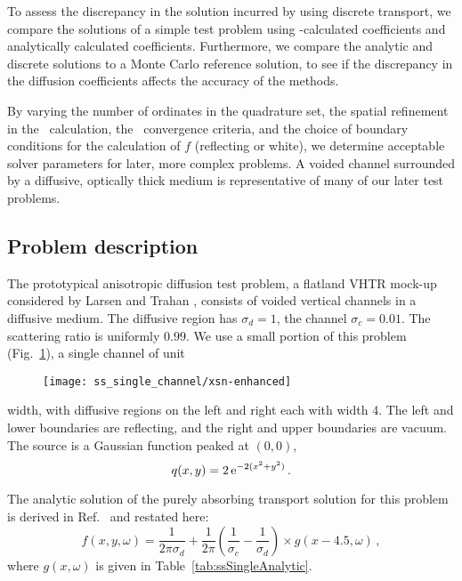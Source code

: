To assess the discrepancy in the solution incurred by using discrete transport,
we compare the solutions of a simple test problem using \SN-calculated
coefficients and analytically calculated coefficients. Furthermore, we compare
the analytic and discrete solutions to a Monte Carlo reference solution, to see
if the discrepancy in the diffusion coefficients affects the accuracy of
the methods.

By varying the number of ordinates in the quadrature set, the spatial
refinement in the \SN\ calculation, the \SN\ convergence criteria, and the
choice of boundary conditions for the calculation of $f$ (reflecting or white),
we determine acceptable solver parameters for later, more complex
problems.  A
voided channel surrounded by a diffusive, optically thick medium is
representative of many of our later test problems.

\subsection{Problem description}

The prototypical anisotropic diffusion test problem, a flatland VHTR mock-up
considered by Larsen and Trahan \cite{Lar2009c}, consists of voided vertical channels in a
diffusive medium. The diffusive region has $\sigma_d=1$, the channel
$\sigma_c=0.01$. The scattering ratio is uniformly $0.99$.  We use a small
portion of this problem (Fig.~\ref{fig:ssSingleXsn}), a single channel of unit
%
\begin{figure}[htb]
  \centering
  \texttt{[image: ss\_single\_channel/xsn-enhanced]}
  \label{fig:ssSingleXsn}
\end{figure}
%
width, with diffusive regions on the left and right each with width 4. The left
and lower boundaries are reflecting, and the right and upper boundaries are
vacuum. The source is a Gaussian function peaked at $(0,0)$,
\begin{equation*}
  q(x,y) = 2 \mathop{}\!\mathrm{e}^{-2 (x^2 + y^2)}\,.
\end{equation*}

The analytic solution of the purely absorbing transport solution for this
problem is derived in Ref.~\cite{Lar2009c} and restated here:
\begin{equation}\label{eq:ssSingleAnalytic}
  f(x,y,\omega)
  = \frac{1}{2\pi \sigma_d}
  + \frac{1}{2\pi} \left( \frac{1}{\sigma_c} - \frac{1}{\sigma_d} \right)
  \times g(x - 4.5,\omega)\,,
\end{equation}
where $g(x,\omega)$ is given in Table~\ref{tab:ssSingleAnalytic}.

